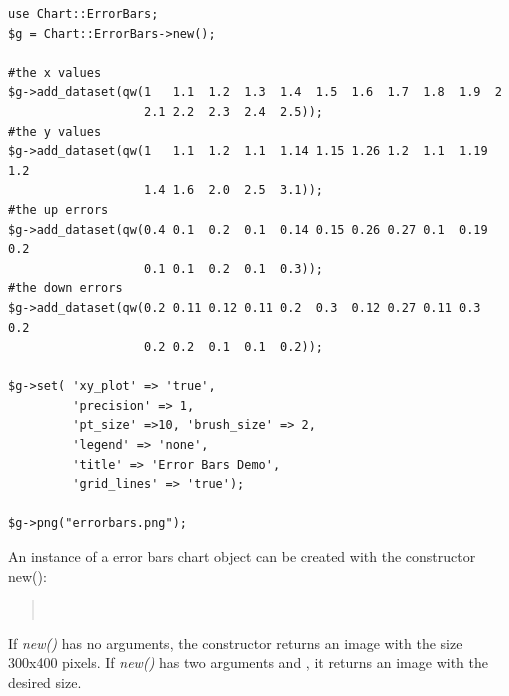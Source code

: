 \begin{verbatim}
use Chart::ErrorBars;
$g = Chart::ErrorBars->new();

#the x values
$g->add_dataset(qw(1   1.1  1.2  1.3  1.4  1.5  1.6  1.7  1.8  1.9  2
                   2.1 2.2  2.3  2.4  2.5));
#the y values
$g->add_dataset(qw(1   1.1  1.2  1.1  1.14 1.15 1.26 1.2  1.1  1.19 1.2
                   1.4 1.6  2.0  2.5  3.1));
#the up errors
$g->add_dataset(qw(0.4 0.1  0.2  0.1  0.14 0.15 0.26 0.27 0.1  0.19 0.2
                   0.1 0.1  0.2  0.1  0.3));
#the down errors
$g->add_dataset(qw(0.2 0.11 0.12 0.11 0.2  0.3  0.12 0.27 0.11 0.3  0.2
                   0.2 0.2  0.1  0.1  0.2));
                   
$g->set( 'xy_plot' => 'true',
         'precision' => 1,
         'pt_size' =>10, 'brush_size' => 2,
         'legend' => 'none',
         'title' => 'Error Bars Demo',
         'grid_lines' => 'true');

$g->png("errorbars.png");
\end{verbatim}

\begin{Constructor}
An instance of a error bars chart object can be created with the constructor new():
\begin{quote}
\parindent 0pt
\\
\end{quote}

If \textit{new()} has no arguments, the constructor returns an image with the size 300x400 pixels. If \textit{new()} has two arguments  and , 
it returns an image with the desired size.
\end{Constructor}


\Methods
{} \\[\parabstand]


